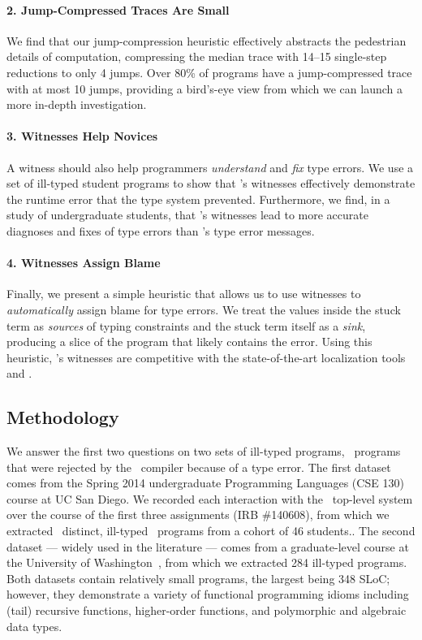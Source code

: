 \paragraph{2. Jump-Compressed Traces Are Small}
We find that our jump-compression heuristic effectively abstracts the
pedestrian details of computation, compressing the median trace with
14--15 single-step reductions to only 4 jumps.
%
Over 80\% of programs have a jump-compressed trace with at most 10
jumps, providing a bird's-eye view from which we can launch a more
in-depth investigation.

\paragraph{3. Witnesses Help Novices}
A witness should also help programmers \emph{understand} and
\emph{fix} type errors.
%
We use a set of ill-typed student programs to show that \toolname's
witnesses effectively demonstrate the runtime error that the type
system prevented.
%
Furthermore, we find, in a study of undergraduate students, that
\toolname's witnesses lead to more accurate diagnoses and fixes of type
errors than \ocaml's type error messages.

\paragraph{4. Witnesses Assign Blame}
Finally, we present a simple heuristic that allows us to use witnesses
to \emph{automatically} assign blame for type errors.
%
We treat the values inside the stuck term as \emph{sources} of typing
constraints and the stuck term itself as a \emph{sink}, producing
a slice of the program that likely contains the error.
%
Using this heuristic, \toolname's witnesses are competitive with the
state-of-the-art localization tools \mycroft and \sherrloc.

\subsection{Methodology}
\label{sec:nanomaly:methodology}
We answer the first two questions on two sets of ill-typed programs,
\ie\ programs that were rejected by the \ocaml\ compiler because of a
type error.
%
The first dataset comes from the Spring 2014 undergraduate Programming
Languages (CSE 130) course at UC San Diego.
%
We recorded each interaction with the \ocaml\ top-level system over the
course of the first three assignments (IRB
\#140608),
from which we extracted \ucsdsize\ distinct, ill-typed \ocaml\ programs
from a cohort of 46 students..
%
The second dataset --- widely used in the literature --- comes from a
graduate-level course at the University of Washington~\cite{Lerner2006-pj},
from which we extracted 284 ill-typed programs.
%
Both datasets contain relatively small programs, the largest being 348
SLoC; however, they demonstrate a variety of functional programming
idioms including (tail) recursive functions, higher-order functions,
and polymorphic and algebraic data types. %

